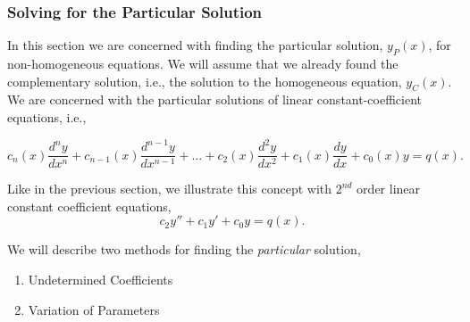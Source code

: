 \subsubsection{Solving for the Particular Solution}

In this section we are concerned with finding the particular solution, $y_P(x)$, for non-homogeneous equations. We will assume that we already found the complementary solution, i.e., the solution to the homogeneous equation, $y_C(x)$. We are concerned with the particular solutions of linear constant-coefficient equations, i.e., 

\begin{equation}
\label{nonhomogeneous_eq} c_n(x) \frac{d^n y}{dx^n} + c_{n-1}(x) \frac{d^{n-1} y}{dx^{n-1}} + \ldots + c_2(x) \frac{d^2 y}{dx^2} + c_1(x) \frac{dy}{dx} + c_0(x) y = q(x).
\end{equation}

Like in the previous section, we illustrate this concept with $2^{nd}$ order linear constant coefficient equations, $$c_2 y'' + c_1 y' + c_0 y = q(x).$$

We will describe two methods for finding the \emph{particular} solution,
\begin{enumerate}
\item Undetermined Coefficients
\item Variation of Parameters
\end{enumerate}

